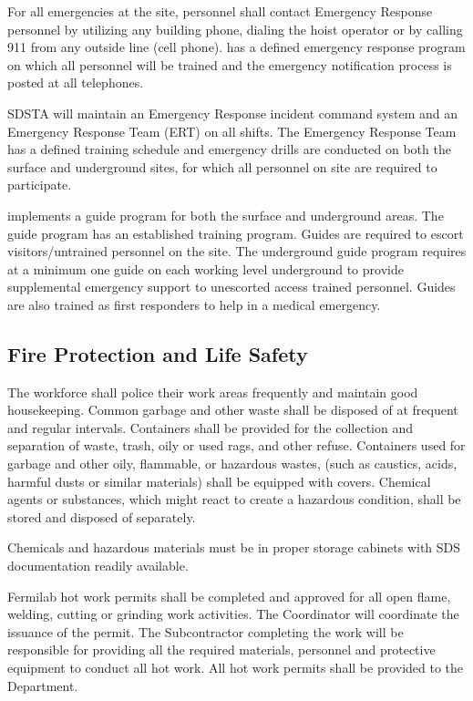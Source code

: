 For all emergencies at the \surf site, personnel shall contact
Emergency Response personnel by utilizing any building phone, dialing
the hoist operator or by calling 911 from any outside line (cell
phone).  \surf has a defined emergency response program on which all
personnel will be trained and the emergency notification process is
posted at all telephones.

SDSTA will maintain an Emergency Response incident command system
and an Emergency Response Team (ERT) on all shifts. The Emergency
Response Team has a defined training schedule and emergency drills are
conducted on both the surface and underground sites, for which all
personnel on site are required to participate.

\surf implements a guide program for both the surface and underground
areas. The guide program has an established training program. Guides
are required to escort visitors/untrained personnel on the \surf
site. The underground guide program requires at a minimum one guide on
each working level underground to provide supplemental emergency
support to unescorted access trained personnel. Guides are also
trained as first responders to help in a medical emergency.

\subsection{Fire Protection and Life Safety}

The workforce shall police their work areas frequently and maintain
good housekeeping. Common garbage and other waste shall be disposed of
at frequent and regular intervals. Containers shall be provided for
the collection and separation of waste, trash, oily or used rags, and
other refuse.  Containers used for garbage and other oily, flammable,
or hazardous wastes, (such as caustics, acids, harmful dusts or
similar materials) shall be equipped with covers.  Chemical agents or
substances, which might react to create a hazardous condition, shall
be stored and disposed of separately.

Chemicals and hazardous materials must be in proper storage cabinets
with SDS documentation readily available.

Fermilab hot work permits shall be completed and approved for all open
flame, welding, cutting or grinding work activities.  The 
 Coordinator will coordinate the issuance of the permit.
The Subcontractor completing the work will be responsible for
providing all the required materials, personnel and protective
equipment to conduct all hot work. All hot work permits shall be
provided to the \surf {} Department.

